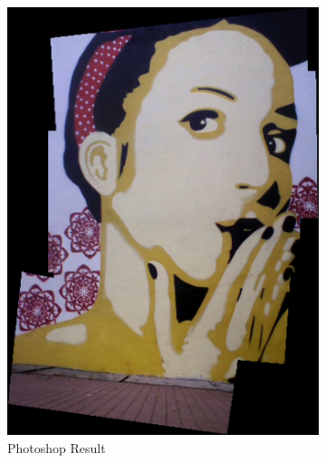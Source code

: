 \begin{figure}
\begin{subfigure}[b]{0.3\textwidth}
\includegraphics[width=\linewidth]{figures/sac3/photoshop.jpg}
\caption{Photoshop Result}
\end{subfigure}
\begin{subfigure}[b]{0.3\textwidth}
\centering

\end{subfigure}
\end{figure}
